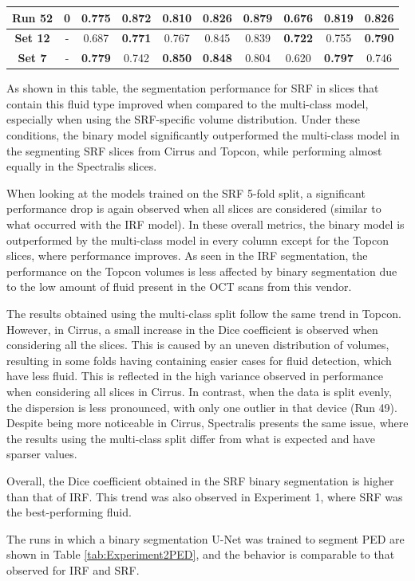 \begin{table}[!ht]
\begin{tabular}{|c|c|cc|cc|cc|cc|}
		\textbf{Run 52} & 0 & 0.775 & \textbf{0.872} & 0.810 & 0.826 & 0.879 & 0.676 & 0.819 & \textbf{0.826} \\
		
		\hline
		
		\textbf{Set 12} & - & 0.687 & \textbf{0.771} & 0.767 & 0.845 & 0.839 & \textbf{0.722} & 0.755 & \textbf{0.790} \\
		
		\hline
		\hline
		
		\textbf{Set 7} & - & \textbf{0.779} & 0.742 & \textbf{0.850} & \textbf{0.848} & 0.804 & 0.620 & \textbf{0.797} & 0.746 \\
		
		\hline
		
	\end{tabular}
	\label{tab:Experiment2SRF}
\end{table}

As shown in this table, the segmentation performance for SRF in slices that contain this fluid type improved when compared to the multi-class model, especially when using the SRF-specific volume distribution. Under these conditions, the binary model significantly outperformed the multi-class model in the segmenting SRF slices from Cirrus and Topcon, while performing almost equally in the Spectralis slices.
\par
When looking at the models trained on the SRF 5-fold split, a significant performance drop is again observed when all slices are considered (similar to what occurred with the IRF model). In these overall metrics, the binary model is outperformed by the multi-class model in every column except for the Topcon slices, where performance improves. As seen in the IRF segmentation, the performance on the Topcon volumes is less affected by binary segmentation due to the low amount of fluid present in the OCT scans from this vendor.
\par
The results obtained using the multi-class split follow the same trend in Topcon. However, in Cirrus, a small increase in the Dice coefficient is observed when considering all the slices. This is caused by an uneven distribution of volumes, resulting in some folds having containing easier cases for fluid detection, which have less fluid. This is reflected in the high variance observed in performance when considering all slices in Cirrus. In contrast, when the data is split evenly, the dispersion is less pronounced, with only one outlier in that device (Run 49). Despite being more noticeable in Cirrus, Spectralis presents the same issue, where the results using the multi-class split differ from what is expected and have sparser values.
\par
Overall, the Dice coefficient obtained in the SRF binary segmentation is higher than that of IRF. This trend was also observed in Experiment 1, where SRF was the best-performing fluid.
\par
The runs in which a binary segmentation U-Net was trained to segment PED are shown in Table \ref{tab:Experiment2PED}, and the behavior is comparable to that observed for IRF and SRF.

